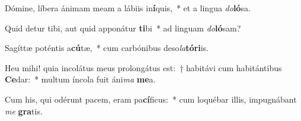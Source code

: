 \item Dómine, líbera ánimam meam a lábiis in\textbf{í}quis,~* et a lingua \textit{do}\textbf{ló}sa.
\item Quid detur tibi, aut quid apponátur \textbf{ti}bi~* ad linguam \textit{do}\textbf{ló}sam?
\item Sagíttæ poténtis a\textbf{cú}tæ,~* cum carbónibus deso\textit{la}\textbf{tó}\textbf{ri}is.
\item Heu mihi! quia incolátus meus prolongátus est:~† habitávi cum habitántibus \textbf{Ce}dar:~* multum íncola fuit áni\textit{ma} \textbf{me}a.
\item Cum his, qui odérunt pacem, eram pa\textbf{cí}ficus:~* cum loquébar illis, impugnábant \textit{me} \textbf{gra}tis.
